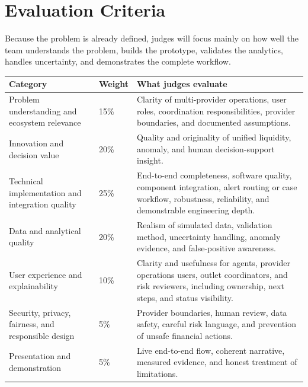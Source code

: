 \documentclass[11pt,a4paper]{article}
\begin{document}
\section{Evaluation Criteria}
Because the problem is already defined, judges will focus mainly on how well the team understands the problem, builds the prototype, validates the analytics, handles uncertainty, and demonstrates the complete workflow.

\vspace{1em}
\noindent
\begin{tabularx}{\textwidth}{@{} l l X @{}}
\toprule
\textbf{Category} & \textbf{Weight} & \textbf{What judges evaluate} \\
\midrule
Problem understanding and ecosystem relevance & 15\% & Clarity of multi-provider operations, user roles, coordination responsibilities, provider boundaries, and documented assumptions. \\
\addlinespace
Innovation and decision value & 20\% & Quality and originality of unified liquidity, anomaly, and human decision-support insight. \\
\addlinespace
Technical implementation and integration quality & 25\% & End-to-end completeness, software quality, component integration, alert routing or case workflow, robustness, reliability, and demonstrable engineering depth. \\
\addlinespace
Data and analytical quality & 20\% & Realism of simulated data, validation method, uncertainty handling, anomaly evidence, and false-positive awareness. \\
\addlinespace
User experience and explainability & 10\% & Clarity and usefulness for agents, provider operations users, outlet coordinators, and risk reviewers, including ownership, next steps, and status visibility. \\
\addlinespace
Security, privacy, fairness, and responsible design & 5\% & Provider boundaries, human review, data safety, careful risk language, and prevention of unsafe financial actions. \\
\addlinespace
Presentation and demonstration & 5\% & Live end-to-end flow, coherent narrative, measured evidence, and honest treatment of limitations. \\
\bottomrule
\end{tabularx}
\end{document}
